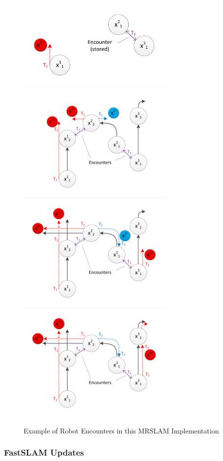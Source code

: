\begin{figure}[ht!]
\centering
	\includegraphics[width=3in]{../FinalFigures/multiencounter_1.pdf} \\
	\includegraphics[width=3in]{../FinalFigures/multiencounter_2.pdf} \\
	\includegraphics[width=3in]{../FinalFigures/multiencounter_3.pdf} \\
	\includegraphics[width=3in]{../FinalFigures/multiencounter_4.pdf} \\
\caption{Example of Robot Encounters in this MRSLAM Implementation}
\end{figure}



\subsubsection{FastSLAM Updates}

